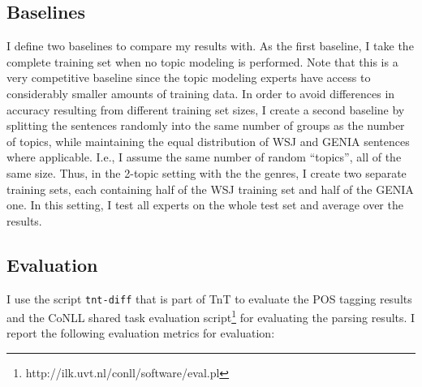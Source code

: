 \subsection{Baselines}

I define two baselines to compare my results with. As the first baseline, I take the complete training set when no topic modeling is performed. Note that this is a very competitive baseline since the topic modeling experts have access to considerably smaller amounts of training data.  In order to avoid differences in accuracy resulting from different training set sizes, I create a second baseline by splitting the sentences randomly into the same number of groups as the number of topics, while maintaining the equal distribution of WSJ and GENIA sentences where applicable. I.e., I assume the same number of random ``topics'', all of the same size. Thus, in the 2-topic setting with the the genres, I create two separate training sets, each containing half of the WSJ training set and half of the GENIA one. In this setting, I test all experts on the whole test set and average over the results.

\subsection{Evaluation}

I use the script \texttt{tnt-diff} that is part of TnT to evaluate the POS tagging results  and the CoNLL shared task evaluation script\footnote{http://ilk.uvt.nl/conll/software/eval.pl} for evaluating the parsing results. I report the following evaluation metrics for evaluation:

